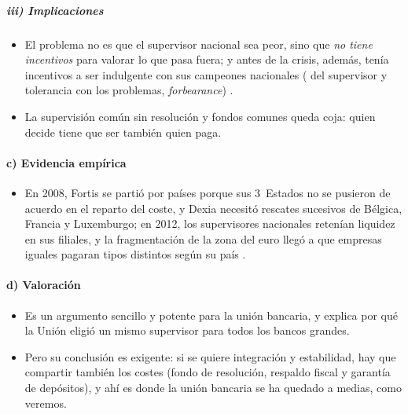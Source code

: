 \documentclass[11pt]{article}
\begin{document}
\begin{infografia}[H]
\centering
\caption{El trilema financiero}\label{figu:trilema-financiero}
\end{infografia}

\subparagraph{iii) Implicaciones}

\begin{itemize}
\item El problema no es que el supervisor nacional sea peor, sino que \emph{no tiene incentivos} para valorar lo que pasa fuera; y antes de la crisis, además, tenía incentivos a ser indulgente con sus campeones nacionales ( del supervisor y tolerancia con los problemas, \emph{forbearance}) .
\item La supervisión común sin resolución y fondos comunes queda coja: quien decide tiene que ser también quien paga.
\end{itemize}

\paragraph{c) Evidencia empírica}

\begin{itemize}
\item En 2008, Fortis se partió por países porque sus 3~Estados no se pusieron de acuerdo en el reparto del coste, y Dexia necesitó rescates sucesivos de Bélgica, Francia y Luxemburgo; en 2012, los supervisores nacionales retenían liquidez en sus filiales, y la fragmentación de la zona del euro llegó a que empresas iguales pagaran tipos distintos según su país\nocite{DeHaanOosterlooSchoenmaker2012} .
\end{itemize}

\paragraph{d) Valoración}

\begin{itemize}
\item Es un argumento sencillo y potente para la unión bancaria, y explica por qué la Unión eligió un mismo supervisor para todos los bancos grandes.
\item Pero su conclusión es exigente: si se quiere integración y estabilidad, hay que compartir también los costes (fondo de resolución, respaldo fiscal y garantía de depósitos), y ahí es donde la unión bancaria se ha quedado a medias, como veremos.
\end{itemize}
\end{document}
